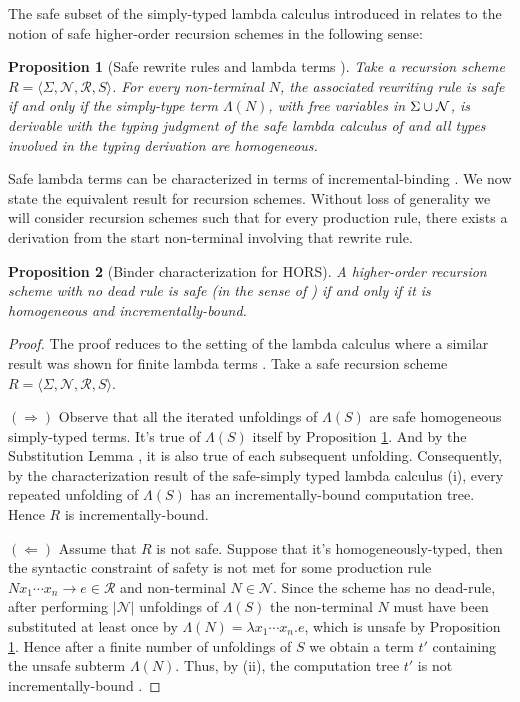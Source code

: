 \documentclass[a4paper]{article}[12pt]
\newtheorem{proposition}{Proposition}[section]
\theoremstyle{remark}
\theoremstyle{definition}
\begin{document}
The safe subset of the simply-typed lambda calculus introduced in \cite{blumong:safelambdacalculus,BlumPhd} relates to the notion of safe higher-order recursion schemes in the following sense:
\begin{proposition}[Safe rewrite rules and lambda terms {\cite[Proposition 3.11]{BlumPhd}}]
\label{prop:safelambdacorresp}
Take a recursion scheme $R = \langle \Sigma, \mathcal{N}, \mathcal{R}, S \rangle$.
For every non-terminal $N$, the associated rewriting rule is safe if and only if the simply-type term $\Lambda(N)$, with free variables in $\Sigma\cup\mathcal{N}$, is derivable with the typing judgment of the safe lambda calculus of \cite{BlumPhd} and all types involved in the typing derivation are homogeneous.
\end{proposition}

Safe lambda terms can be characterized in terms of incremental-binding \cite[Proposition 5.11]{BlumPhd}. We now state the equivalent result for recursion schemes. Without loss of generality we will consider recursion schemes  such that for every production rule, there exists a derivation from the start non-terminal involving that rewrite rule.
\begin{proposition}[Binder characterization for HORS]
\label{prop:horsSafeBinderCharact}
A higher-order recursion scheme with no dead rule is \emph{safe} (in the sense of \cite{KNU02}) if and only if it is homogeneous and incrementally-bound.
\end{proposition}
\begin{proof}
The proof reduces to the setting of the lambda calculus where a similar result was shown for finite lambda terms \cite{BlumPhd}.
Take a safe recursion scheme $R = \langle \Sigma, \mathcal{N}, \mathcal{R}, S \rangle$.

$(\Longrightarrow)$ Observe that all the iterated unfoldings of $\Lambda(S)$ are safe homogeneous simply-typed terms. It's true of $\Lambda(S)$ itself by Proposition \ref{prop:safelambdacorresp}. And by the Substitution Lemma \cite[3.19]{BlumPhd}, it is also true of each subsequent unfolding. Consequently, by the characterization result of the safe-simply typed lambda calculus \cite[Proposition 5.11]{BlumPhd}(i), every repeated unfolding of $\Lambda(S)$ has an incrementally-bound computation tree. Hence $R$ is incrementally-bound.

$(\Longleftarrow)$ Assume that $R$ is not safe. Suppose that it's homogeneously-typed, then the syntactic constraint of safety is not met for some production rule $N x_1 \cdots x_n \rightarrow e \in \mathcal{R}$ and non-terminal $N \in \mathcal{N}$. Since the scheme has no dead-rule, after performing $|\mathcal{N}|$ unfoldings of $\Lambda(S)$ the non-terminal $N$ must have been substituted at least once by $\Lambda(N) = \lambda x_1 \cdots x_n. e$, which is unsafe by Proposition \ref{prop:safelambdacorresp}. Hence after a finite number of unfoldings of $S$ we obtain a term $t'$ containing the unsafe subterm $\Lambda(N)$.
Thus, by \cite[Proposition 5.11]{BlumPhd}(ii), the computation tree $t'$ is not incrementally-bound .
\end{proof}
\end{document}
